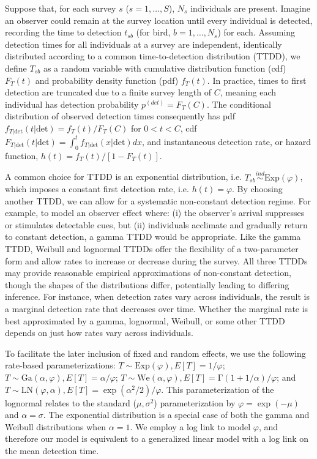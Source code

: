 \documentclass[12pt]{article}
\newcommand{\Exp}{\mbox{Exp}}
\newcommand{\Ga}{\mbox{Ga}}
\newcommand{\We}{\mbox{We}}
\newcommand{\LN}{\mbox{LN}}
\newcommand{\pdet}{p^{(det)}}
\newcommand{\ind}{\stackrel{ind}{\sim}}
\newcommand{\dt}{\text{det}}
\newcommand{\ftdt}{f_{T|\dt}(t|\dt)}
\newcommand{\nobs}{n^{(obs)}}
\begin{document}
Suppose that, for each survey $s$ ($s=1,\dots,S$), $N_s$ individuals are present.  
Imagine an observer could remain at the survey location until every individual is detected, recording the time to detection $t_{sb}$ (for bird, $b=1,\dots,N_s$) for each.
Assuming detection times for all individuals at a survey are independent, identically distributed according to a common time-to-detection distribution (TTDD), we define $T_{sb}$ as a random variable with cumulative distribution function (cdf) $F_T(t)$ and probability density function (pdf) $f_T(t)$.
In practice, times to first detection are truncated due to a finite survey length of $C$, meaning each individual has detection probability $\pdet=F_T(C)$.  
The conditional distribution of observed detection times consequently has pdf $\ftdt= f_T(t)/F_T(C)$ for $0<t<C$, cdf $F_{T|\dt}(t|\dt) = \int_0^t f_{T|\dt}(x|\dt) dx$, and instantaneous detection rate, or hazard function, $h(t) = f_T(t) / [1-F_T(t)]$. 

A common choice for TTDD is an exponential distribution, i.e. $T_{sb}\ind \mbox{Exp}(\varphi)$, which imposes a constant first detection rate, i.e. $h(t) = \varphi$.
By choosing another TTDD, we can allow for a systematic non-constant detection regime. 
For example, to model an observer effect where: (i) the observer's arrival suppresses or stimulates detectable cues, but (ii) individuals acclimate and gradually return to constant detection, a gamma TTDD would be appropriate.
Like the gamma TTDD, Weibull and lognormal TTDDs offer the flexibility of a two-parameter form and allow rates to increase or decrease during the survey.
All three TTDDs may provide reasonable empirical approximations of non-constant detection, though the shapes of the distributions differ, potentially leading to differing inference.
For instance, when detection rates vary across individuals, the result is a marginal detection rate that decreases over time.
Whether the marginal rate is best approximated by a gamma, lognormal, Weibull, or some other TTDD depends on just how rates vary across individuals.

To facilitate the later inclusion of fixed and random effects, we use the following rate-based parameterizations: $T\sim \Exp(\varphi), E[T]=1/\varphi$; $T\sim \Ga(\alpha,\varphi), E[T] = \alpha/\varphi$; $T\sim \We(\alpha,\varphi), E[T]=\mathrm{\Gamma}(1+1/\alpha)/\varphi$; and $T\sim \LN(\varphi,\alpha), E[T] = \exp(\alpha^2/2)/\varphi$.  
This parameterization of the lognormal relates to the standard ($\mu, \sigma^2$) parameterization by $\varphi = \exp(-\mu)$ and $\alpha = \sigma$.  %
The exponential distribution is a special case of both the gamma and Weibull distributions when $\alpha=1$. 
We employ a log link to model $\varphi$, and therefore our model is equivalent to a generalized linear model with a log link on the mean detection time.
\end{document}

